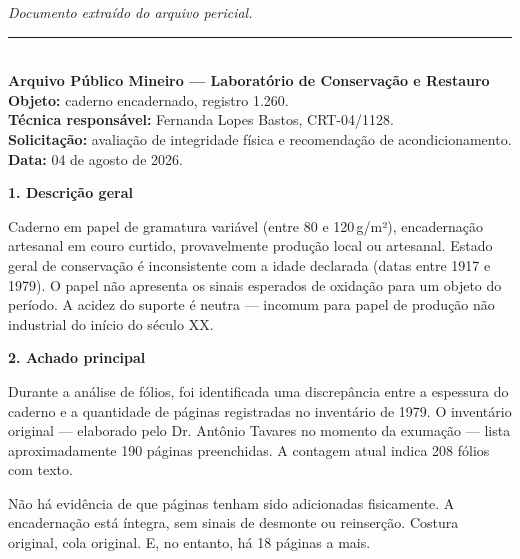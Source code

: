 
\noindent \textit{Documento extraído do arquivo pericial.}

\vspace{0.5em}\noindent\rule{\textwidth}{0.5pt}\vspace{0.5em}

\\[-0.2em]

\noindent \textbf{Arquivo Público Mineiro --- Laboratório de Conservação e Restauro}\\
\noindent \textbf{Objeto:} caderno encadernado, registro 1.260.\\
\noindent \textbf{Técnica responsável:} Fernanda Lopes Bastos, CRT-04/1128.\\
\noindent \textbf{Solicitação:} avaliação de integridade física e recomendação de acondicionamento.\\
\noindent\textbf{Data:} 04 de agosto de 2026.

\noindent \textbf{1. Descrição geral}

\noindent Caderno em papel de gramatura variável (entre 80 e 120\,g/m²), encadernação artesanal em couro curtido, provavelmente produção local ou artesanal. Estado geral de conservação é inconsistente com a idade declarada (datas entre 1917 e 1979). O papel não apresenta os sinais esperados de oxidação para um objeto do período. A acidez do suporte é neutra --- incomum para papel de produção não industrial do início do século XX.

\noindent \textbf{2. Achado principal}

\noindent Durante a análise de fólios, foi identificada uma discrepância entre a espessura do caderno e a quantidade de páginas registradas no inventário de 1979. O inventário original --- elaborado pelo Dr. Antônio Tavares no momento da exumação --- lista aproximadamente 190 páginas preenchidas. A contagem atual indica 208 fólios com texto.

\noindent Não há evidência de que páginas tenham sido adicionadas fisicamente. A encadernação está íntegra, sem sinais de desmonte ou reinserção. Costura original, cola original. E, no entanto, há 18 páginas a mais.

